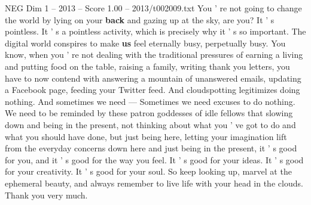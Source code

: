 \begin{textsample}{NEG Dim 1 – 2013 – Score 1.00 – 2013/t002009.txt}
You ' re not going to change the world by lying on your \textbf{back} and gazing up at the sky, are you?
It ' s pointless.
It ' s a pointless activity, which is precisely why it ' s so important.
The digital world conspires to make \textbf{us} feel eternally busy, perpetually busy.
You know, when you ' re not dealing with the traditional pressures of earning a living and putting food on the table, raising a family, writing thank you letters, you have to now contend with answering a mountain of unanswered emails, updating a Facebook page, feeding your Twitter feed.
And cloudspotting legitimizes doing nothing.
And sometimes we need — Sometimes we need excuses to do nothing.
We need to be reminded by these patron goddesses of idle fellows that slowing down and being in the present, not thinking about what you ' ve got to do and what you should have done, but just being here, letting your imagination lift from the everyday concerns down here and just being in the present, it ' s good for you, and it ' s good for the way you feel.
It ' s good for your ideas.
It ' s good for your creativity.
It ' s good for your soul.
So keep looking up, marvel at the ephemeral beauty, and always remember to live life with your head in the clouds.
Thank you very much.

\end{textsample}
